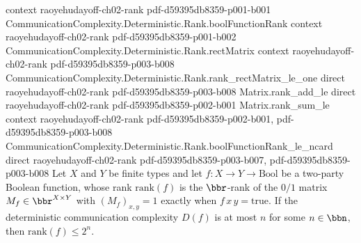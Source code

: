 \begin{theorem}
  {context}
  {raoyehudayoff-ch02-rank}
  {pdf-d59395db8359-p001-b001}
\proofstep
  {CommunicationComplexity.Deterministic.Rank.boolFunctionRank}
  {context}
  {raoyehudayoff-ch02-rank}
  {pdf-d59395db8359-p001-b002}
\proofstep
  {CommunicationComplexity.Deterministic.Rank.rectMatrix}
  {context}
  {raoyehudayoff-ch02-rank}
  {pdf-d59395db8359-p003-b008}
\proofstep
  {CommunicationComplexity.Deterministic.Rank.rank_rectMatrix_le_one}
  {direct}
  {raoyehudayoff-ch02-rank}
  {pdf-d59395db8359-p003-b008}
\proofstep
  {Matrix.rank_add_le}
  {direct}
  {raoyehudayoff-ch02-rank}
  {pdf-d59395db8359-p002-b001}
\proofstep
  {Matrix.rank_sum_le}
  {context}
  {raoyehudayoff-ch02-rank}
  {pdf-d59395db8359-p002-b001,
    pdf-d59395db8359-p003-b008}
\proofstep
  {CommunicationComplexity.Deterministic.Rank.boolFunctionRank_le_ncard}
  {direct}
  {raoyehudayoff-ch02-rank}
  {pdf-d59395db8359-p003-b007,
    pdf-d59395db8359-p003-b008}
Let $X$ and $Y$ be finite types and let $f : X \to Y \to \mathrm{Bool}$ be a two-party
Boolean function, whose rank $\mathrm{rank}(f)$ is the $\bbr$-rank of the $0/1$ matrix
$M_f \in \bbr^{X \times Y}$ with $(M_f)_{x,y} = 1$ exactly when $f\,x\,y =
\mathrm{true}$. If the deterministic communication complexity $D(f)$ is at most $n$ for
some $n \in \bbn$, then $\mathrm{rank}(f) \le 2^n$.
\end{theorem}

